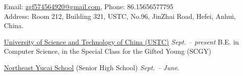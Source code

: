 \documentclass[10pt,a4paper]{article}
\begin{document}
\sloppy  %



\nobreakvspace{0.3em}  %

\noindent Email: \href{mailto:zgf574564920@gmail.com}{\mbox{zgf574564920@gmail.com}}, Phone: \textsmaller{+}86.15656577795
\\
Address: Room 212, Building 321, USTC, No.96, JinZhai Road, Hefei, Anhui, China.

\spacedhrule{0.2em}{-1em}  %


\headedsection  %
{\href{http://ustc.edu.cn/}{University of Science and Technology of China (USTC)}}
{\textit{Sept. -- present}} {%
	\headedsubsection
	{B.E. in Computer Science, in the Special Class for the Gifted Young (SCGY)}
	{}
	{}
}

\headedsection
{\href{http://www.neyc.cn/}{Northeast Yucai School} (Senior High School)}
{\textit{Sept. -- June.}}
{
}


\spacedhrule{0.2em}{-1em}
\end{document}

